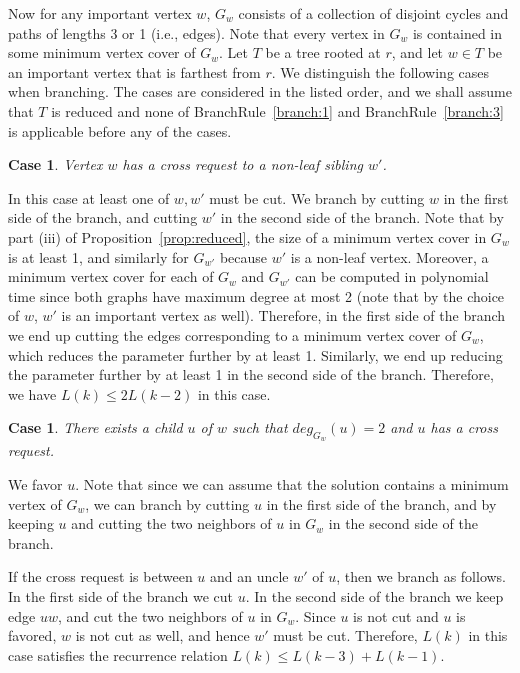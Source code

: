 \documentclass[11pt]{article}
\newtheorem{case}[theorem]{Case}
\begin{document}
Now for any important vertex $w$, $G_w$ consists of a collection of disjoint cycles and paths of lengths 3 or 1 (i.e., edges). Note that every vertex in $G_w$ is contained in some minimum vertex cover of $G_w$. Let $T$ be a tree rooted at $r$, and let $w \in T$ be an important vertex that is farthest from $r$. We distinguish the following cases when branching. The cases are considered in the listed order, and we shall assume that $T$ is reduced and none of BranchRule~\ref{branch:1} and BranchRule~\ref{branch:3} is applicable before any of the cases.

\begin{case}\label{case:0}
Vertex $w$ has a cross request to a non-leaf sibling $w'$.
\end{case}

In this case at least one of $w, w'$ must be cut. We branch by cutting $w$ in the first side of the branch, and cutting $w'$ in the second side of the branch. Note that by part (iii) of Proposition~\ref{prop:reduced}, the size of a minimum vertex cover in $G_w$ is at least 1, and similarly for $G_{w'}$ because $w'$ is a non-leaf vertex. Moreover, a minimum vertex cover for each of $G_w$ and $G_{w'}$ can be computed in polynomial time since both graphs have maximum degree at most 2 (note that by the choice of $w$, $w'$ is an important vertex as well). Therefore, in the first side of the branch we end up cutting the edges corresponding to a minimum vertex cover of $G_w$, which reduces the parameter further by at least 1. Similarly, we end up reducing the parameter further by at least 1 in the second side of the branch. Therefore, we have $L(k) \leq 2L(k-2)$ in this case.

\begin{case}\label{case:2}
There exists a child $u$ of $w$ such that $deg_{G_w}(u) =2$ and $u$ has a cross request.
\end{case}

We favor $u$. Note that since we can assume that the solution contains a minimum vertex of $G_w$, we can branch by cutting $u$ in the first side of the branch, and by keeping $u$ and cutting the two neighbors of $u$ in $G_w$ in the second side of the branch.

If the cross request is between $u$ and an uncle $w'$ of $u$, then we branch as follows. In the first side of the branch we cut $u$. In the second side of the branch we keep edge $uw$, and cut the two neighbors of $u$ in $G_w$. Since $u$ is not cut and $u$ is favored, $w$ is not cut as well, and hence $w'$ must be cut. Therefore, $L(k)$ in this case satisfies the recurrence relation $L(k) \leq L(k-3) + L(k-1)$.
\end{document}
